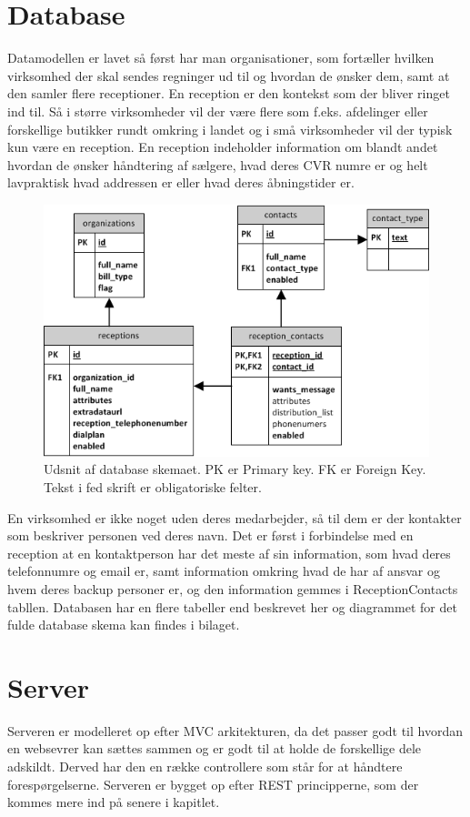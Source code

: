 \section{Database}
Datamodellen er lavet så først har man organisationer, som fortæller hvilken virksomhed der skal sendes regninger ud til og hvordan de ønsker dem, samt at den samler flere receptioner. En reception er den kontekst som der bliver ringet ind til. Så i større virksomheder vil der være flere som f.eks. afdelinger eller forskellige butikker rundt omkring i landet og i små virksomheder vil der typisk kun være en reception. En reception indeholder information om blandt andet hvordan de ønsker håndtering af sælgere, hvad deres CVR numre er og helt lavpraktisk hvad addressen er eller hvad deres åbningstider er. 
\begin{figure}[ht!]
\centering
\includegraphics[scale=0.7]{images/ER_Basic.png}
\caption{Udsnit af database skemaet. PK er Primary key. FK er Foreign Key. Tekst i fed skrift er obligatoriske felter.}
\label{fig:erbasic}
\end{figure}

En virksomhed er ikke noget uden deres medarbejder, så til dem er der kontakter som beskriver personen ved deres navn. Det er først i forbindelse med en reception at en kontaktperson har det meste af sin information, som hvad deres telefonnumre og email er, samt information omkring hvad de har af ansvar og hvem deres backup personer er, og den information gemmes i ReceptionContacts tabllen.
Databasen har en flere tabeller end beskrevet her og diagrammet for det fulde database skema kan findes i bilaget.

\section{Server}
Serveren er modelleret op efter MVC arkitekturen, da det passer godt til hvordan en websevrer kan sættes sammen og er godt til at holde de forskellige dele adskildt. Derved har den en række controllere som står for at håndtere forespørgelserne. Serveren er bygget op efter REST principperne, som der kommes mere ind på senere i kapitlet. 

